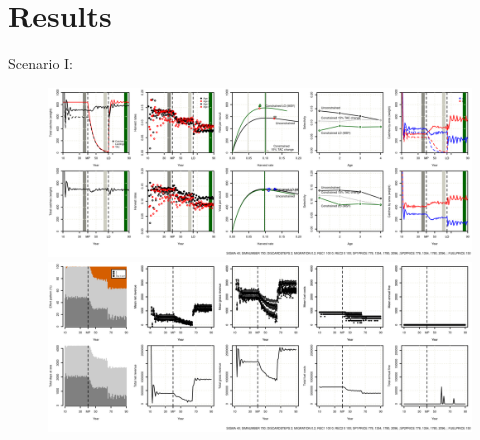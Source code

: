\documentclass[12pt,oneline,a4paper,numbib]{ouparticle}
\numberwithin{equation}{subsection} %
\begin{document}



\section{Results}
\label{sec3}


\newpage
Scenario I:
\begin{figure}[!h]
\centering
\begin{minipage}{.45\textwidth}
\includegraphics[width=0.9\textheight, angle=90]{Figures/Catch_scenarioI.eps} 
\end{minipage}
\hfill
\begin{minipage}{.45\textwidth}
\includegraphics[width=0.9\textheight, angle=90]{Figures/Effort_scenarioI.eps} 
\end{minipage}
\caption{}
\end{figure}
\end{document}
